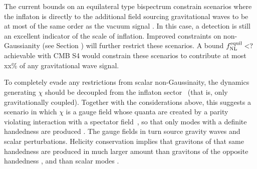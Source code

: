 The current bounds on an equilateral type bispectrum constrain scenarios where the inflaton is directly to the additional field sourcing gravitational waves to be at most of the same order as the vacuum signal \cite{Ozsoy:2014sba, others?}. In this case, a detection is still an excellent indicator of the scale of inflation. Improved constraints on non-Gaussianity (see Section \cite{sec:scalar}) will further restrict these scenarios. A bound $f_{\rm NL}^{\rm equil}<?$ achievable with CMB S4 would constrain these scenarios to contribute at most xx\% of any gravitational wave signal.

To completely evade any restrictions from scalar non-Gaussinaity, the dynamics generating $\chi$ should be decoupled from the inflaton sector~\cite{Barnaby:2012xt} (that is, only gravitationally coupled). Together with the considerations above, this suggests a scenario in which $\chi$ is a gauge field whose quanta are created by a parity violating interaction with a spectator field~\cite{Cook:2011hg,Barnaby:2012xt}, so that only modes with a definite handedness are produced \cite{Anber:2006xt}. The gauge fields in turn source gravity waves and scalar perturbations. Helicity conservation implies that gravitons of that same handedness are produced in much larger amount than gravitons of the opposite handedness \cite{Sorbo:2011rz}, and than scalar modes \cite{Barnaby:2012xt}. 
